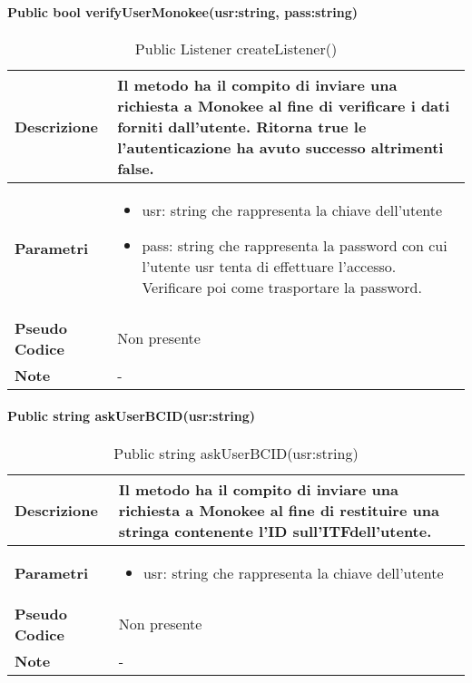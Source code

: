 \paragraph{Public bool verifyUserMonokee(usr:string, pass:string)}
\begin{center}
    \begin{longtable}{|p{3cm}|p{9cm}|}%
    \caption{Public Listener createListener()}
    \label{tab:public-bool-verifyUserMonokee}
    \endfirsthead
    \endhead
    \hline
    \textbf{Descrizione} & Il metodo ha il compito di inviare una richiesta a Monokee al fine di verificare i dati forniti dall’utente. Ritorna true le l’autenticazione ha avuto successo altrimenti false.\\
    \hline
    \textbf{Parametri} &      
        \begin{itemize}
            \item usr: string che rappresenta la chiave dell’utente
            \item pass: string che rappresenta la password con cui l’utente usr tenta di effettuare l’accesso. Verificare poi come trasportare la password.
        \end{itemize}
    \\
    \hline
    \textbf{Pseudo Codice} & Non presente \\
    \hline
    \textbf{Note} & - \\
    \hline
    \end{longtable}
    \end{center}






\paragraph{Public string askUserBCID(usr:string)}
\begin{center}
    \begin{longtable}{|p{3cm}|p{9cm}|}%
    \caption{Public string askUserBCID(usr:string)}
    \label{tab:public-string-askUserBCID}
    \endfirsthead
    \endhead
    \hline
    \textbf{Descrizione} & Il metodo ha il compito di inviare una richiesta a Monokee al fine di restituire una stringa contenente l’ID sull’ITFdell’utente.\\
    \hline
    \textbf{Parametri} &      
        \begin{itemize}
            \item usr: string che rappresenta la chiave dell’utente
        \end{itemize}
    \\
    \hline
    \textbf{Pseudo Codice} & Non presente \\
    \hline
    \textbf{Note} & - \\
    \hline
    \end{longtable}
    \end{center}




